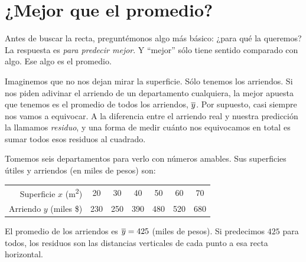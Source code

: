 \section{¿Mejor que el promedio?}

Antes de buscar la recta, preguntémonos algo más básico: ¿para qué la queremos? La respuesta es \emph{para predecir mejor}. Y \enquote{mejor} sólo tiene sentido comparado con algo. Ese algo es el promedio.

Imaginemos que no nos dejan mirar la superficie. Sólo tenemos los arriendos. Si nos piden adivinar el arriendo de un departamento cualquiera, la mejor apuesta que tenemos es el promedio de todos los arriendos, \(\overline{y}\). Por supuesto, casi siempre nos vamos a equivocar. A la diferencia entre el arriendo real y nuestra predicción la llamamos \emph{residuo}, y una forma de medir cuánto nos equivocamos en total es sumar todos esos residuos al cuadrado.

Tomemos seis departamentos para verlo con números amables. Sus superficies útiles y arriendos (en miles de pesos) son:

\begin{center}
\begin{tabular}{rSSSSSS}
\toprule
Superficie \(x\) (\unit{\meter\squared}) & 20 & 30 & 40 & 50 & 60 & 70 \\
Arriendo \(y\) (miles \$) & 230 & 250 & 390 & 480 & 520 & 680 \\
\bottomrule
\end{tabular}
\end{center}

El promedio de los arriendos es \(\overline{y}=\num{425}\) (miles de pesos). Si predecimos \(\num{425}\) para todos, los residuos son las distancias verticales de cada punto a esa recta horizontal.

